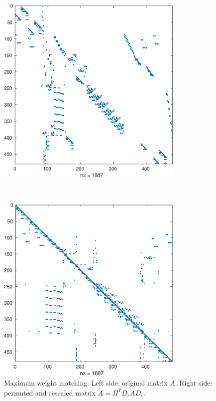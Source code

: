 \begin{figure}
\begin{minipage}{.45\textwidth}
 \begin{center}
%
\includegraphics[width=0.8\textwidth]{figures/west0479} 
 \end{center}
\end{minipage}
~
\begin{minipage}{.45\textwidth}
  \begin{center}
%
\includegraphics[width=0.8\textwidth]{figures/west0479-match} 
 \end{center}  
\end{minipage}
    \caption{Maximum weight matching. Left side: original
      matrix $A$. Right side: permuted and rescaled matrix
      $\tilde A=\Pi^TD_rAD_c$.}
    \label{fig:mwm}
\end{figure}
